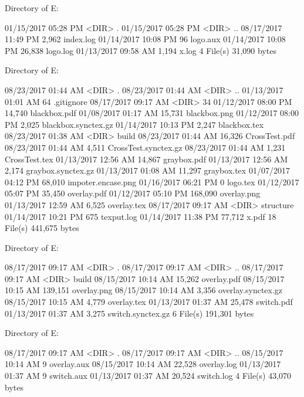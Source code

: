  Directory of E:\Python\apeman\docs\build

01/15/2017  05:28 PM    <DIR>          .
01/15/2017  05:28 PM    <DIR>          ..
08/17/2017  11:49 PM             2,962 index.log
01/14/2017  10:08 PM                96 logo.aux
01/14/2017  10:08 PM            26,838 logo.log
01/13/2017  09:58 AM             1,194 x.log
               4 File(s)         31,090 bytes

 Directory of E:\Python\apeman\docs\figures

08/23/2017  01:44 AM    <DIR>          .
08/23/2017  01:44 AM    <DIR>          ..
01/13/2017  01:01 AM                64 .gitignore
08/17/2017  09:17 AM    <DIR>          34
01/12/2017  08:00 PM            14,740 blackbox.pdf
01/08/2017  01:17 AM            15,731 blackbox.png
01/12/2017  08:00 PM             2,025 blackbox.synctex.gz
01/14/2017  10:13 PM             2,247 blackbox.tex
08/23/2017  01:38 AM    <DIR>          build
08/23/2017  01:44 AM            16,326 CrossTest.pdf
08/23/2017  01:44 AM             4,511 CrossTest.synctex.gz
08/23/2017  01:44 AM             1,231 CrossTest.tex
01/13/2017  12:56 AM            14,867 graybox.pdf
01/13/2017  12:56 AM             2,174 graybox.synctex.gz
01/13/2017  01:08 AM            11,297 graybox.tex
01/07/2017  04:12 PM            68,010 impoter.encase.png
01/16/2017  06:21 PM                 0 logo.tex
01/12/2017  05:07 PM            35,450 overlay.pdf
01/12/2017  05:10 PM           168,090 overlay.png
01/13/2017  12:59 AM             6,525 overlay.tex
08/17/2017  09:17 AM    <DIR>          structure
01/14/2017  10:21 PM               675 texput.log
01/14/2017  11:38 PM            77,712 x.pdf
              18 File(s)        441,675 bytes

 Directory of E:\Python\apeman\docs\figures{}

08/17/2017  09:17 AM    <DIR>          .
08/17/2017  09:17 AM    <DIR>          ..
08/17/2017  09:17 AM    <DIR>          build
08/15/2017  10:14 AM            15,262 overlay.pdf
08/15/2017  10:15 AM           139,151 overlay.png
08/15/2017  10:14 AM             3,356 overlay.synctex.gz
08/15/2017  10:15 AM             4,779 overlay.tex
01/13/2017  01:37 AM            25,478 switch.pdf
01/13/2017  01:37 AM             3,275 switch.synctex.gz
               6 File(s)        191,301 bytes

 Directory of E:\Python\apeman\docs\figures{}\build

08/17/2017  09:17 AM    <DIR>          .
08/17/2017  09:17 AM    <DIR>          ..
08/15/2017  10:14 AM                 9 overlay.aux
08/15/2017  10:14 AM            22,528 overlay.log
01/13/2017  01:37 AM                 9 switch.aux
01/13/2017  01:37 AM            20,524 switch.log
               4 File(s)         43,070 bytes

